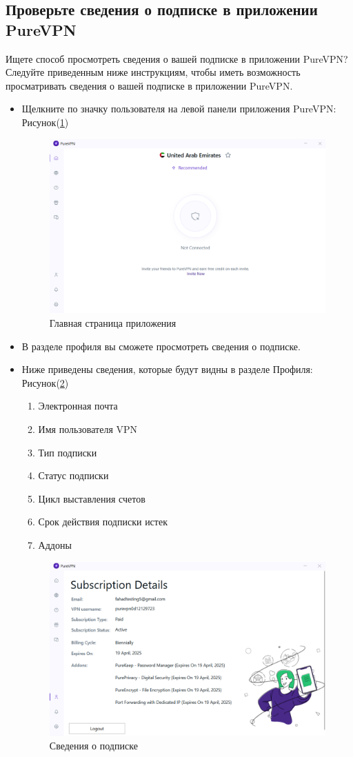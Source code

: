 \subsection{Проверьте сведения о подписке в приложении PureVPN} 
Ищете способ просмотреть сведения о вашей подписке в приложении PureVPN? Следуйте приведенным ниже инструкциям, чтобы иметь возможность просматривать сведения о вашей подписке в приложении PureVPN.
\begin{itemize}
\item Щелкните по значку пользователя на левой панели приложения PureVPN:  Рисунок(\ref{fig:16})
\begin{figure}[H]
\includegraphics[width=12cm]{9.png}
\centering
\caption{Главная страница приложения}
\label{fig:16}
\end{figure}
\item В разделе профиля вы сможете просмотреть сведения о подписке.
\item Ниже приведены сведения, которые будут видны в разделе Профиля:  Рисунок(\ref{fig:17})
\begin{enumerate}
\item Электронная почта
\item Имя пользователя VPN
\item Тип подписки
\item Статус подписки
\item Цикл выставления счетов
\item Срок действия подписки истек
\item Аддоны
\end{enumerate}
\begin{figure}[H]
\includegraphics[width=12cm]{11.png}
\centering
\caption{Сведения о подписке}
\label{fig:17}
\end{figure}
\end{itemize}

